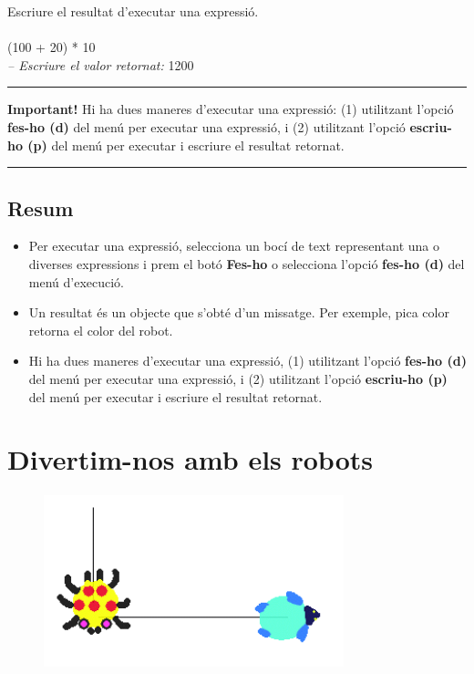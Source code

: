 \begin{script}  Escriure el resultat d'executar una expressió.
\noindent
\textsf{\upshape
\\
\\
(100 + 20) * 10\\
{\itshape -- Escriure el valor retornat:} 1200\\
}
\label{scr5-1}
\end{script}

\noindent
\rule{\textwidth}{2pt}
\noindent
\textbf{Important!}  Hi ha dues maneres d'executar una expressió: (1) utilitzant l'opció \textbf{fes-ho (d)} del menú per executar una expressió,
i (2) utilitzant l'opció \textbf{escriu-ho (p)} del menú per executar i escriure el resultat retornat.\\
\noindent
\rule{\textwidth}{2pt}

\section{Resum}
\begin{itemize}
\item Per executar una expressió, selecciona un bocí de text representant una o diverses expressions i prem el botó \textbf{Fes-ho} o selecciona l'opció \textbf{fes-ho (d)} del menú d'execució.
\item Un resultat és un objecte que s'obté d'un missatge. Per exemple, \textsf{pica color} retorna el color del robot.
\item Hi ha dues maneres d'executar una expressió, (1) utilitzant l'opció \textbf{fes-ho (d)} del menú per executar una expressió,
i (2) utilitzant l'opció \textbf{escriu-ho (p)} del menú per executar i escriure el resultat retornat.
\end{itemize}

\chapter{Divertim-nos amb els robots}
\label{cap6}


\begin{figure}[h]
\includegraphics[height=50mm ,width=87mm ]{Imatges/figura6-0.png} 
\label{fig0600}
\end{figure}

